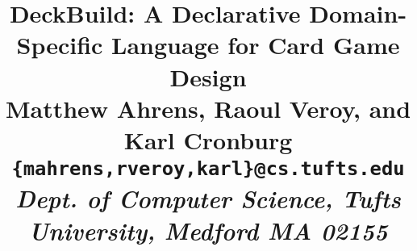\documentclass[pldi]{sigplanconf-pldi15}
\begin{document}
%
%

\title{DeckBuild: A Declarative Domain-Specific Language for Card Game Design\\
  \null
  {\small \textnormal{
    Matthew Ahrens, Raoul Veroy, and Karl Cronburg\\
    \texttt{\{mahrens,rveroy,karl\}@cs.tufts.edu}\\
    \emph{Dept. of Computer Science, Tufts University, Medford MA 02155}\\
  }}
}

\maketitle







{\softraggedright


}



\end{document}
